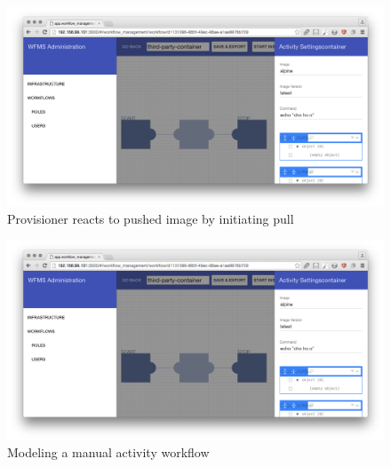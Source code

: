   \begin{figure}[htbp]
    \centering
    \includegraphics[width=\textwidth]{./content/images/usecase/case_study_10.png}
    \caption{Provisioner reacts to pushed image by initiating pull}
    \label{fig:provisioner_pulls}
  \end{figure}

  \begin{figure}[htbp]
    \centering
    \includegraphics[width=\textwidth]{./content/images/usecase/case_study_10.png}
    \caption{Modeling a manual activity workflow}
    \label{fig:manual_wf}
  \end{figure}
